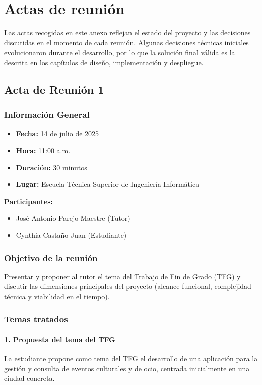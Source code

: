 \chapter{Actas de reunión}\label{anexo:actas}

Las actas recogidas en este anexo reflejan el estado del proyecto y las decisiones discutidas en el momento de cada reunión. Algunas decisiones técnicas iniciales evolucionaron durante el desarrollo, por lo que la solución final válida es la descrita en los capítulos de diseño, implementación y despliegue.

\section*{Acta de Reunión 1}

\subsection*{Información General}
\begin{itemize}
    \item \textbf{Fecha:} 14 de julio de 2025
    \item \textbf{Hora:} 11:00 a.m.
    \item \textbf{Duración:} 30 minutos
    \item \textbf{Lugar:} Escuela Técnica Superior de Ingeniería Informática
\end{itemize}

\textbf{Participantes:}
\begin{itemize}
    \item José Antonio Parejo Maestre (Tutor)
    \item Cynthia Castaño Juan (Estudiante)
\end{itemize}

\subsection*{Objetivo de la reunión}
Presentar y proponer al tutor el tema del Trabajo de Fin de Grado (TFG) y discutir las dimensiones principales del proyecto (alcance funcional, complejidad técnica y viabilidad en el tiempo).

\subsection*{Temas tratados}

\subsubsection*{1. Propuesta del tema del TFG}
La estudiante propone como tema del TFG el desarrollo de una aplicación para la gestión y consulta de eventos culturales y de ocio, centrada inicialmente en una ciudad concreta.

